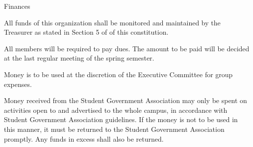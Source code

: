 {
	\begin{article}{Finances}
		\item All funds of this organization shall be monitored and maintained by the Treasurer as stated in Section 5 of  of this constitution.
		\item All members will be required to pay dues.  The amount to be paid will be decided at the last regular meeting of the spring semester.
		\item Money is to be used at the discretion of the Executive Committee for group expenses.
		\item Money received from the Student Government Association may only be spent on activities open to and advertised to the whole campus, in accordance with Student Government Association guidelines.  If the money is not to be used in this manner, it must be returned to the Student Government Association promptly.  Any funds in excess shall also be returned.
	\end{article}
}